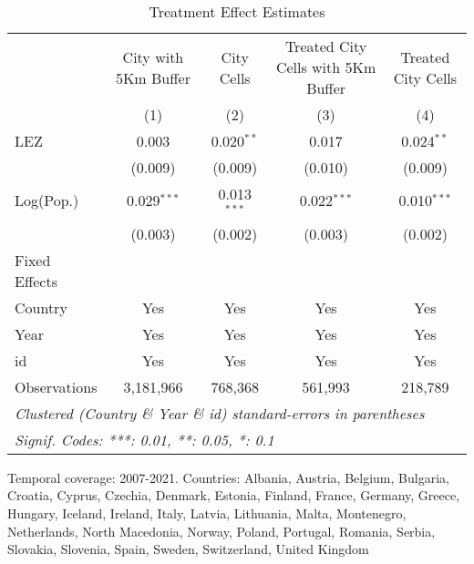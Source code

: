 
\begin{table}[htbp]
   \caption{\label{tab:te} Treatment Effect Estimates}
   \centering
   \small
   \begin{tabular}{lcccc}
      \tabularnewline \midrule \midrule
                   & City with 5Km Buffer & City Cells    & Treated City Cells with 5Km Buffer & Treated City Cells \\   
                   & (1)                  & (2)           & (3)                                & (4)\\  
      LEZ          & 0.003                & 0.020$^{**}$  & 0.017                              & 0.024$^{**}$\\   
                   & (0.009)              & (0.009)       & (0.010)                            & (0.009)\\   
      Log(Pop.)    & 0.029$^{***}$        & 0.013$^{***}$ & 0.022$^{***}$                      & 0.010$^{***}$\\   
                   & (0.003)              & (0.002)       & (0.003)                            & (0.002)\\   
      Fixed Effects\\
      Country      & Yes                  & Yes           & Yes                                & Yes\\  
      Year         & Yes                  & Yes           & Yes                                & Yes\\  
      id           & Yes                  & Yes           & Yes                                & Yes\\  
      \midrule 
      Observations & 3,181,966            & 768,368       & 561,993                            & 218,789\\  
      \midrule \midrule
      \multicolumn{5}{l}{\emph{Clustered (Country \& Year \& id) standard-errors in parentheses}}\\
      \multicolumn{5}{l}{\emph{Signif. Codes: ***: 0.01, **: 0.05, *: 0.1}}\\
   \end{tabular}
   
   \par \raggedright 
   Temporal coverage: 2007-2021. Countries: Albania, Austria, Belgium, Bulgaria, Croatia, Cyprus, Czechia, Denmark, Estonia, Finland, France, Germany, Greece, Hungary, Iceland, Ireland, Italy, Latvia, Lithuania, Malta, Montenegro, Netherlands, North Macedonia, Norway, Poland, Portugal, Romania, Serbia, Slovakia, Slovenia, Spain, Sweden, Switzerland, United Kingdom
\end{table}


